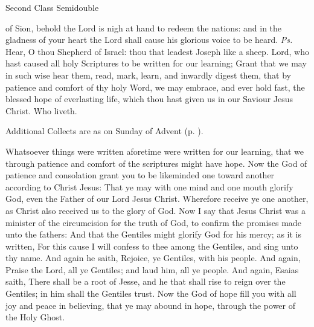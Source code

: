 \begin{inhead}
{Second Class Semidouble}
\end{inhead}
\par\noindent
{}



\introit
{} of Sion, behold the Lord is nigh at hand to redeem the nations: and in the gladness of your heart the Lord shall cause his glorious voice to be heard. \textit{Ps.} Hear, O thou Shepherd of Israel: thou that leadest Joseph like a sheep.
\collect
{} Lord, who hast caused all holy Scriptures to be written for our learning; Grant that we may in such wise hear them, read, mark, learn, and inwardly digest them, that by patience and comfort of thy holy Word, we may embrace, and ever hold fast, the blessed hope of everlasting life, which thou hast given us in our Saviour Jesus Christ. Who liveth.
\begin{rubric}
    Additional Collects are as on  Sunday of Advent (p. \pageref{AdventI}).
\end{rubric}
 Whatsoever things were written aforetime were written for our learning, that we through patience and comfort of the scriptures might have hope. Now the God of patience and consolation grant you to be likeminded one toward another according to Christ Jesus: That ye may with one mind and one mouth glorify God, even the Father of our Lord Jesus Christ. Wherefore receive ye one another, as Christ also received us to the glory of God. Now I say that Jesus Christ was a minister of the circumcision for the truth of God, to confirm the promises made unto the fathers: And that the Gentiles might glorify God for his mercy; as it is written, For this cause I will confess to thee among the Gentiles, and sing unto thy name. And again he saith, Rejoice, ye Gentiles, with his people. And again, Praise the Lord, all ye Gentiles; and laud him, all ye people. And again, Esaias saith, There shall be a root of Jesse, and he that shall rise to reign over the Gentiles; in him shall the Gentiles trust. Now the God of hope fill you with all joy and peace in believing, that ye may abound in hope, through the power of the Holy Ghost.

